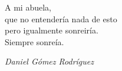 
\cleardoublepage
\thispagestyle{empty} %

\begin{minipage}[c][\textheight][c]{\textwidth} %
    \raggedleft %

    A mi abuela, \\
    que no entendería nada de esto\\
    pero igualmente sonreiría. \\
    Siempre sonreía.

    \bigskip

    \emph{Daniel Gómez Rodríguez}

\end{minipage}

\blankpage
